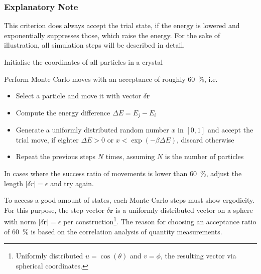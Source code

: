 \subsubsection*{Explanatory Note}
This criterion does always accept the trial state, if the energy is lowered and exponentially suppresses those, which raise the energy.
For the sake of illustration, all simulation steps will be described in detail.
\begin{enumerate}
	\item{Initialise the coordinates of all particles in a crystal}
	\item{Perform Monte Carlo moves with an acceptance of roughly \SI{60}{\percent}, i.e.
		\begin{itemize}
			\item{Select a particle and move it with vector $\delta \bm r$}
			\item{Compute the energy difference $\Delta E = E_j - E_i$}
			\item{Generate a uniformly distributed random number $x$ in $[0, 1]$ and accept the trial move, if eighter $\Delta E>0$ or $x < \exp(-\beta\Delta E)$, discard otherwise}
			\item{Repeat the previous steps $N$ times, assuming $N$ is the number of particles}
		\end{itemize}
	\item{In cases where the success ratio of movements is lower than \SI{60}{\percent}, adjust the length $\left|\delta r\right|=\epsilon$ and try again.}
}
\end{enumerate}
To access a good amount of states, each Monte-Carlo steps must show ergo\-dicity.
For this purpose, the step vector $\delta \bm r$ is a uniformly distributed vector on a sphere with norm $\left|\delta\bm r\right| = \epsilon$ per construction\footnote{Uniformly distributed $u=\cos(\theta)$ and $v=\phi$, the resulting vector via spherical coordinates.}.
The reason for choosing an acceptance ratio of \SI{60}{\percent} is based on the correlation analysis of quantity measurements.

